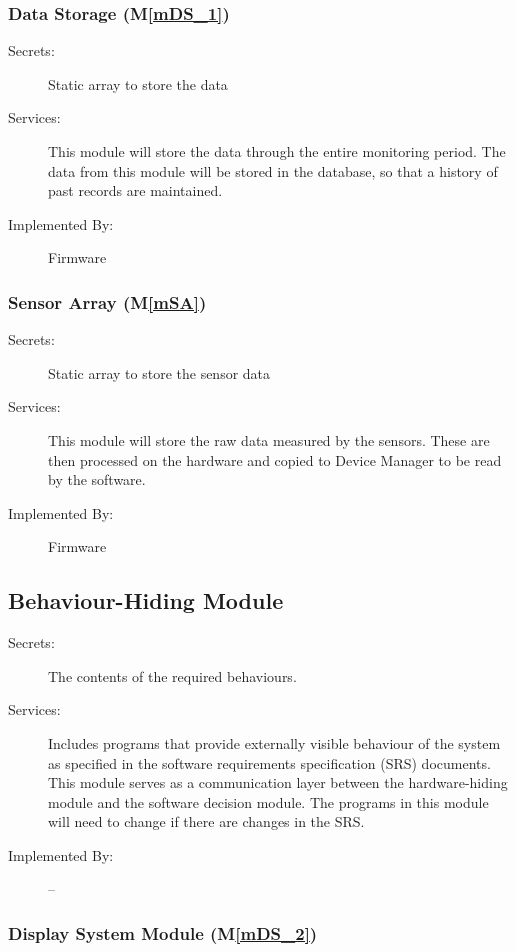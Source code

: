 \documentclass[12pt, titlepage]{article}
\newcommand{\mref}[1]{M\ref{#1}}
\begin{document}
\subsubsection{Data Storage (\mref{mDS_1})}
\begin{description}
  \item[Secrets:] Static array to store the data
  \item[Services:] This module will store the data through the entire monitoring period. The data from this module will be stored in the database, so that a history of past records are maintained.
  \item[Implemented By:] Firmware
\end{description}

\subsubsection{Sensor Array (\mref{mSA})}
\begin{description}
  \item[Secrets:] Static array to store the sensor data
  \item[Services:] This module will store the raw data measured by the sensors. These are then processed on the hardware and copied to Device Manager to be read by the software.
  \item[Implemented By:] Firmware
\end{description}

\subsection{Behaviour-Hiding Module}

\begin{description}
  \item[Secrets:]The contents of the required behaviours.
  \item[Services:]Includes programs that provide externally visible behaviour of
  the system as specified in the software requirements specification (SRS)
  documents. This module serves as a communication layer between the
  hardware-hiding module and the software decision module. The programs in this
  module will need to change if there are changes in the SRS.
  \item[Implemented By:] --
\end{description}

\subsubsection{Display System Module (\mref{mDS_2}) }
\end{document}
